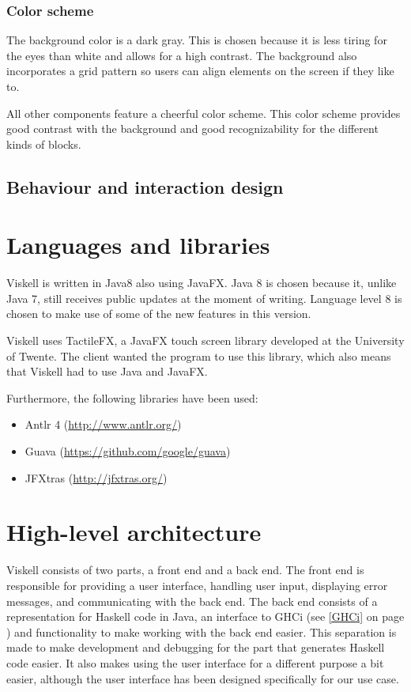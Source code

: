 \subsubsection{Color scheme}

The background color is a dark gray.
This is chosen because it is less tiring for the eyes than white and allows for a high contrast.
The background also incorporates a grid pattern so users can align elements on the screen if they like to.

All other components feature a cheerful color scheme.
This color scheme provides good contrast with the background and good recognizability for the different kinds of blocks.

\subsection{Behaviour and interaction design}

\section{Languages and libraries}

Viskell is written in Java8 also using JavaFX. 
Java 8 is chosen because it, unlike Java 7, still receives public updates at the moment of writing.
Language level 8 is chosen to make use of some of the new features in this version.

Viskell uses TactileFX, a JavaFX touch screen library developed at the University of Twente.
The client wanted the program to use this library, which also means that Viskell had to use Java and JavaFX.

Furthermore, the following libraries have been used:

\begin{itemize}
	\item Antlr 4 (\url{http://www.antlr.org/})
	\item Guava (\url{https://github.com/google/guava})
	\item JFXtras (\url{http://jfxtras.org/})
\end{itemize}

\section{High-level architecture}

Viskell consists of two parts, a front end and a back end.  
The front end is responsible for providing a user interface, handling user input, displaying error messages, and communicating with the back end.
The back end consists of a representation for Haskell code in Java, an interface to GHCi (see \ref{GHCi} on page \pageref{GHCi}) and functionality to make working with the back end easier.
This separation is made to make development and debugging for the part that generates Haskell code easier.
It also makes using the user interface for a different purpose a bit easier, although the user interface has been designed specifically for our use case.

